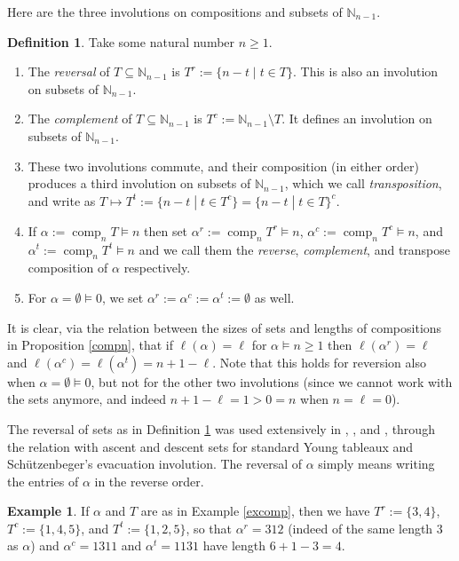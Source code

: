 \documentclass{article}
\theoremstyle{definition}
\newtheorem{defn}[thm]{Definition}
\newtheorem{ex}[thm]{Example}
\begin{document}
Here are the three involutions on compositions and subsets of $\mathbb{N}_{n-1}$.
\begin{defn}
Take some natural number $n\geq1$.
\begin{enumerate}[$(i)$]
\item The \emph{reversal} of $T\subseteq\mathbb{N}_{n-1}$ is $T^{r}:=\{n-t\;|\;t \in T\}$. This is also an involution on subsets of $\mathbb{N}_{n-1}$.
\item The \emph{complement} of $T\subseteq\mathbb{N}_{n-1}$ is $T^{c}:=\mathbb{N}_{n-1} \setminus T$. It defines an involution on subsets of $\mathbb{N}_{n-1}$.
\item These two involutions commute, and their composition (in either order) produces a third involution on subsets of $\mathbb{N}_{n-1}$, which we call \emph{transposition}, and write as $T \mapsto T^{t}:=\{n-t\;|\;t \in T^{c}\}=\{n-t\;|\;t \in T\}^{c}$.
\item If $\alpha:=\operatorname{comp}_{n}T \vDash n$ then set $\alpha^{r}:=\operatorname{comp}_{n}T^{r} \vDash n$, $\alpha^{c}:=\operatorname{comp}_{n}T^{c} \vDash n$, and $\alpha^{t}:=\operatorname{comp}_{n}T^{t} \vDash n$ and we call them the \emph{reverse}, \emph{complement}, and {transpose} composition of $\alpha$ respectively.
\item For $\alpha=\emptyset\vDash0$, we set $\alpha^{r}:=\alpha^{c}:=\alpha^{t}:=\emptyset$ as well.
\end{enumerate} \label{invdef}
\end{defn}
It is clear, via the relation between the sizes of sets and lengths of compositions in Proposition \ref{compn}, that if $\ell(\alpha)=\ell$ for $\alpha \vDash n\geq1$ then $\ell(\alpha^{r})=\ell$ and $\ell(\alpha^{c})=\ell(\alpha^{t})=n+1-\ell$. Note that this holds for reversion also when $\alpha=\emptyset\vDash0$, but not for the other two involutions (since we cannot work with the sets anymore, and indeed $n+1-\ell=1>0=n$ when $n=\ell=0$).

The reversal of sets as in Definition \ref{invdef} was used extensively in \cite{[Z1]}, \cite{[Z2]}, and \cite{[Z3]}, through the relation with ascent and descent sets for standard Young tableaux and Sch\"{u}tzenbeger's evacuation involution. The reversal of $\alpha$ simply means writing the entries of $\alpha$ in the reverse order.
\begin{ex}
If $\alpha$ and $T$ are as in Example \ref{excomp}, then we have $T^{r}:=\{3,4\}$, $T^{c}:=\{1,4,5\}$, and $T^{t}:=\{1,2,5\}$, so that $\alpha^{r}=312$ (indeed of the same length 3 as $\alpha$) and $\alpha^{c}=1311$ and $\alpha^{t}=1131$ have length $6+1-3=4$. \label{invex}
\end{ex}
\end{document}
